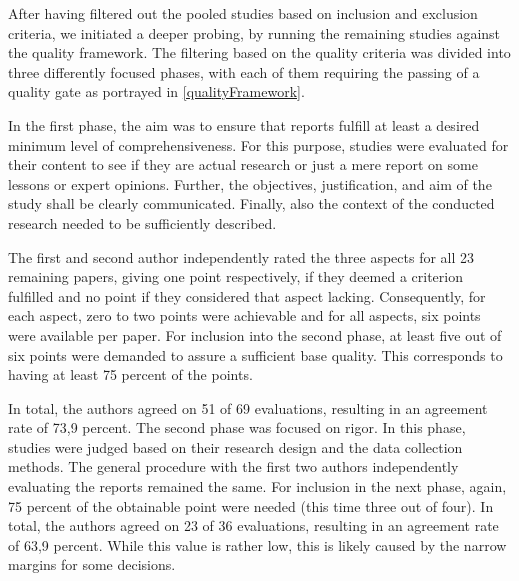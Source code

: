 \documentclass[conference]{IEEEtran}
\begin{document}
After having filtered out the pooled studies based on inclusion and exclusion criteria, we initiated a deeper probing, by running the remaining studies against the quality framework. The filtering based on the quality criteria was divided into three differently focused phases, with each of them requiring the passing of a quality gate as portrayed in \ref{qualityFramework}. 

In the first phase, the aim was to ensure that reports fulfill at least a desired minimum level of comprehensiveness. For this purpose, studies were evaluated for their content to see if they are actual research or just a mere report on some lessons or expert opinions. Further, the objectives, justification, and aim of the study shall be clearly communicated. Finally, also the context of the conducted research needed to be sufficiently described.



The first and second author independently rated the three aspects for all 23 remaining papers, giving one point respectively, if they deemed a criterion fulfilled and no point if they considered that aspect lacking. Consequently, for each aspect, zero to two points were achievable and for all aspects, six points were available per paper. For inclusion into the second phase, at least five out of six points were demanded to assure a sufficient base quality. This corresponds to having at least 75 percent of the points. 



In total, the authors agreed on 51 of 69 evaluations, resulting in an agreement rate of 73,9 percent. The second phase was focused on rigor. In this phase, studies were judged based on their research design and the data collection methods. The general procedure with the first two authors independently evaluating the reports remained the same. For inclusion in the next phase, again, 75 percent of the obtainable point were needed (this time three out of four). In total, the authors agreed on 23 of 36 evaluations, resulting in an agreement rate of 63,9 percent. While this value is rather low, this is likely caused by the narrow margins for some decisions. 
\end{document}
